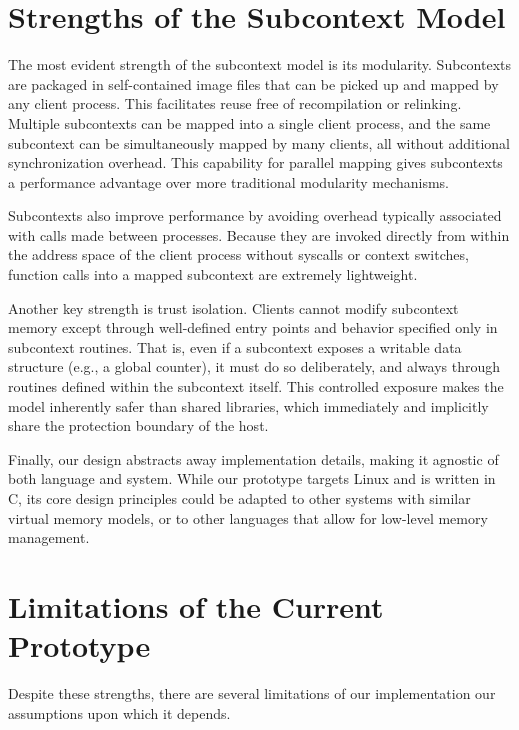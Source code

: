 \section*{Strengths of the Subcontext Model}
The most evident strength of the subcontext model is its modularity. Subcontexts are packaged in self-contained image files that can be picked up and mapped by any client process. This facilitates reuse free of recompilation or relinking. Multiple subcontexts can be mapped into a single client process, and the same subcontext can be simultaneously mapped by many clients, all without additional synchronization overhead. This capability for parallel mapping gives subcontexts a performance advantage over more traditional modularity mechanisms.

Subcontexts also improve performance by avoiding overhead typically associated with  calls made between processes. Because they are invoked directly from within the address space of the client process without syscalls or context switches, function calls into a mapped subcontext are extremely lightweight.

Another key strength is trust isolation. Clients cannot modify subcontext memory except through well-defined entry points and behavior specified only in subcontext routines. That is, even if a subcontext exposes a writable data structure (e.g., a global counter), it must do so deliberately, and always through routines defined within the subcontext itself. This controlled exposure makes the model inherently safer than shared libraries, which immediately and implicitly share the protection boundary of the host.

Finally, our design abstracts away implementation details, making it agnostic of both language and system. While our prototype targets Linux and is written in C, its core design principles could be adapted to other systems with similar virtual memory models, or to other languages that allow for low-level memory management.

\section*{Limitations of the Current Prototype}
Despite these strengths, there are several limitations of our implementation our assumptions upon which it depends.

